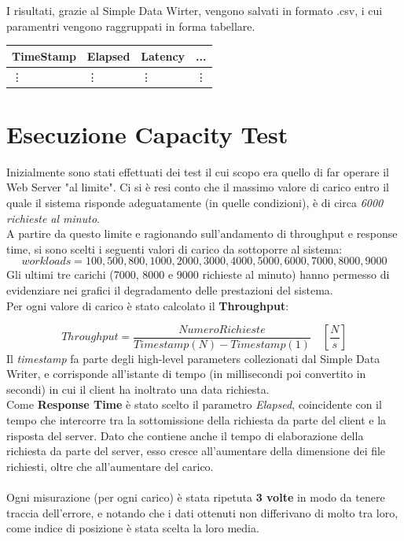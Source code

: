 I risultati, grazie al Simple Data Wirter, vengono salvati in formato .csv, i cui paramentri vengono raggruppati in forma tabellare.
\begin{center}
\begin{tabular}{|l|l|l|l|}
	\hline
	TimeStamp & Elapsed & Latency & ... \\
	\hline
	\vdots &  \vdots & \vdots & \vdots \\
	\hline
\end{tabular}
\end{center}
\section{Esecuzione Capacity Test}
Inizialmente sono stati effettuati dei test il cui scopo era quello di far operare il Web Server "al limite". Ci si è resi conto che il massimo valore di carico entro il quale il sistema risponde adeguatamente (in quelle condizioni), è di circa \textit{6000 richieste al minuto}. 
\\
A partire da questo limite e ragionando sull'andamento di throughput e response time, si sono scelti i seguenti valori di carico da sottoporre al sistema:
\begin{equation*}
	workloads = {100, 500, 800, 1000, 2000, 3000, 4000, 5000, 6000, 7000, 8000, 9000}
\end{equation*}
Gli ultimi tre carichi (7000, 8000 e 9000 richieste al minuto) hanno permesso di evidenziare nei grafici il degradamento delle prestazioni del sistema.
\\
Per ogni valore di carico è stato calcolato il \textbf{Throughput}:

\begin{equation}
	Throughput = \frac{NumeroRichieste}{Timestamp(N) - Timestamp(1)} \quad  \left[ \frac{N}{s} \right] 
\end{equation}
Il \textit{timestamp} fa parte degli high-level parameters collezionati dal Simple Data Writer, e corrisponde all'istante di tempo (in millisecondi poi convertito in secondi) in cui il client ha inoltrato una data richiesta.
\\
Come \textbf{Response Time} è stato scelto il parametro \textit{Elapsed}, coincidente con il tempo che intercorre tra la sottomissione della richiesta da parte del client e la risposta del server. Dato che contiene anche il tempo di elaborazione della richiesta da parte del server, esso cresce all'aumentare della dimensione dei file richiesti, oltre che all'aumentare del carico.
\\
\\
Ogni misurazione (per ogni carico) è stata ripetuta \textbf{3 volte} in modo da tenere traccia dell'errore, e notando che i dati ottenuti non differivano di molto tra loro, come indice di posizione è stata scelta la loro media.
\\
